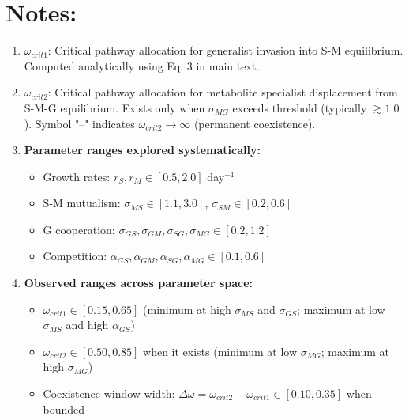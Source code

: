 \documentclass[11pt]{article}
\begin{document}
\section*{Notes:}

\begin{enumerate}
    \item \textbf{$\omega_{crit1}$}: Critical pathway allocation for generalist invasion into S-M equilibrium. Computed analytically using Eq. 3 in main text.

    \item \textbf{$\omega_{crit2}$}: Critical pathway allocation for metabolite specialist displacement from S-M-G equilibrium. Exists only when $\sigma_{MG}$ exceeds threshold (typically $\gtrsim 1.0$). Symbol "--" indicates $\omega_{crit2} \to \infty$ (permanent coexistence).

    \item \textbf{Parameter ranges explored systematically:}
    \begin{itemize}
        \item Growth rates: $r_S, r_M \in [0.5, 2.0]$ day$^{-1}$
        \item S-M mutualism: $\sigma_{MS} \in [1.1, 3.0]$, $\sigma_{SM} \in [0.2, 0.6]$
        \item G cooperation: $\sigma_{GS}, \sigma_{GM}, \sigma_{SG}, \sigma_{MG} \in [0.2, 1.2]$
        \item Competition: $\alpha_{GS}, \alpha_{GM}, \alpha_{SG}, \alpha_{MG} \in [0.1, 0.6]$
    \end{itemize}

    \item \textbf{Observed ranges across parameter space:}
    \begin{itemize}
        \item $\omega_{crit1} \in [0.15, 0.65]$ (minimum at high $\sigma_{MS}$ and $\sigma_{GS}$; maximum at low $\sigma_{MS}$ and high $\alpha_{GS}$)
        \item $\omega_{crit2} \in [0.50, 0.85]$ when it exists (minimum at low $\sigma_{MG}$; maximum at high $\sigma_{MG}$)
        \item Coexistence window width: $\Delta\omega = \omega_{crit2} - \omega_{crit1} \in [0.10, 0.35]$ when bounded
    \end{itemize}


\end{enumerate}
\end{document}
